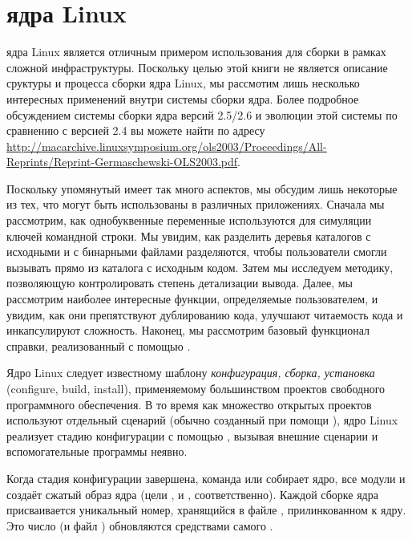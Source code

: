\section{\Makefile{} ядра Linux}

\Makefile{} ядра Linux является отличным примером использования
\GNUmake{} для сборки в рамках сложной инфраструктуры. Поскольку целью
этой книги не является описание сруктуры и процесса сборки ядра Linux,
мы рассмотим лишь несколько интересных применений \GNUmake{} внутри
системы сборки ядра. Более подробное обсуждением системы сборки ядра
версий 2.5/2.6 и эволюции этой системы по сравнению с версией 2.4 вы
можете найти по адресу
\url{http://macarchive.linuxsymposium.org/ols2003/Proceedings/All-Reprints/Reprint-Germaschewski-OLS2003.pdf}.

Поскольку упомянутый \Makefile{} имеет так много аспектов, мы обсудим
лишь некоторые из тех, что могут быть использованы в различных
приложениях. Сначала мы рассмотрим, как однобуквенные переменные
\GNUmake{} используются для симуляции ключей командной строки. Мы
увидим, как разделить деревья каталогов с исходными и с бинарными
файлами разделяются, чтобы пользователи смогли вызывать \GNUmake{}
прямо из каталога с исходным кодом. Затем мы исследуем методику,
позволяющую  контролировать степень детализации
вывода. Далее, мы рассмотрим наиболее интересные функции, определяемые
пользователем, и увидим, как они препятствуют дублированию кода,
улучшают читаемость кода и инкапсулируют сложность. Наконец, мы
рассмотрим базовый функционал справки, реализованный с помощью
\GNUmake{}.

Ядро Linux следует известному шаблону \textit{конфигурация, сборка,
  установка} (configure, build, install), применяемому большинством
проектов свободного программного обеспечения. В то время как множество
открытых проектов используют отдельный сценарий
 (обычно созданный при помощи
), ядро Linux реализует стадию конфигурации с
помощью \GNUmake{}, вызывая внешние сценарии и вспомогательные
программы неявно.

Когда стадия конфигурации завершена, команда  или
 собирает ядро, все модули и создаёт сжатый образ
ядра (цели ,  и
, соответственно). Каждой сборке ядра присваивается
уникальный номер, хранящийся в файле ,
прилинкованном к ядру. Это число (и файл )
обновляются средствами самого .

